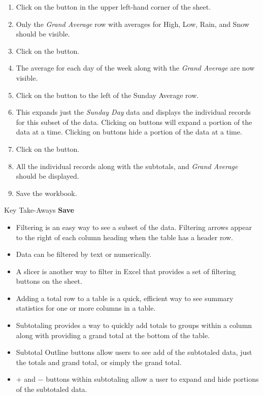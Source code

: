 \begin{enumerate}
	\item Click on the  button in the upper left-hand corner of the sheet.
	\item Only the \textit{Grand Average} row with averages for High, Low, Rain, and Snow should be visible.
	\item Click on the  button.
	\item The average for each day of the week along with the \textit{Grand Average} are now visible.
	\item Click on the  button to the left of the Sunday Average row.
	\item This expands just the \textit{Sunday Day} data and displays the individual records for this subset of the data. Clicking on  buttons will expand a portion of the data at a time. Clicking on  buttons hide a portion of the data at a time.
	\item Click on the  button.
	\item All the individual records along with the subtotals, and \textit{Grand Average} should be displayed. 
	\item Save the workbook.
\end{enumerate}

\begin{center}
	\begin{tkwbox}{Key Take-Aways}
		\textbf{Save}
		\\
		\begin{itemize}
			\setlength{\itemsep}{0pt}
			\setlength{\parskip}{0pt}
			\setlength{\parsep}{0pt}

			\item Filtering is an easy way to see a subset of the data. Filtering arrows appear to the right of each column heading when the table has a header row.
			\item Data can be filtered by text or numerically.
			\item A slicer is another way to filter in Excel that provides a set of filtering buttons on the sheet.
			\item Adding a total row to a table is a quick, efficient way to see summary statistics for one or more columns in a table.
			\item Subtotaling provides a way to quickly add totals to groups within a column along with providing a grand total at the bottom of the table.
			\item Subtotal Outline buttons allow users to see add of the subtotaled data, just the totals and grand total, or simply the grand total.
			\item $ + $ and $ - $ buttons within subtotaling allow a user to expand and hide portions of the subtotaled data.
			
		\end{itemize}
	\end{tkwbox}
\end{center}

